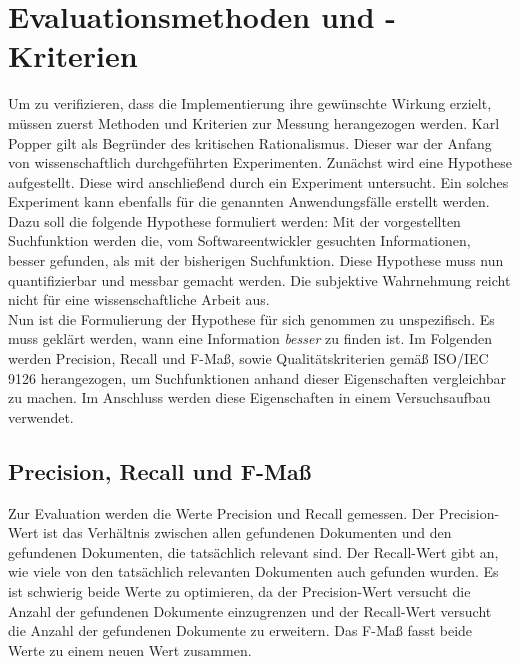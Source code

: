 \chapter{Evaluationsmethoden und -Kriterien}
Um zu verifizieren, dass die Implementierung ihre gewünschte Wirkung erzielt, müssen zuerst Methoden und Kriterien zur Messung herangezogen werden.
Karl Popper gilt als Begründer des kritischen Rationalismus.
Dieser war der Anfang von wissenschaftlich durchgeführten Experimenten.
Zunächst wird eine Hypothese aufgestellt.
Diese wird anschließend durch ein Experiment untersucht.
Ein solches Experiment kann ebenfalls für die genannten Anwendungsfälle erstellt werden.
Dazu soll die folgende Hypothese formuliert werden: Mit der vorgestellten Suchfunktion werden die, vom Softwareentwickler gesuchten Informationen, besser gefunden, als mit der bisherigen Suchfunktion.
Diese Hypothese muss nun quantifizierbar und messbar gemacht werden.
Die subjektive Wahrnehmung reicht nicht für eine wissenschaftliche Arbeit aus.\\

Nun ist die Formulierung der Hypothese für sich genommen zu unspezifisch.
Es muss geklärt werden, wann eine Information \textit{besser} zu finden ist.
Im Folgenden werden Precision, Recall und F-Maß, sowie Qualitätskriterien gemäß ISO/IEC 9126 herangezogen, um Suchfunktionen anhand dieser Eigenschaften vergleichbar zu machen.
Im Anschluss werden diese Eigenschaften in einem Versuchsaufbau verwendet. 

\section{Precision, Recall und F-Maß}
Zur Evaluation werden die Werte Precision und Recall gemessen.
Der Precision-Wert ist das Verhältnis zwischen allen gefundenen Dokumenten und den gefundenen Dokumenten, die tatsächlich relevant sind.
Der Recall-Wert gibt an, wie viele von den tatsächlich relevanten Dokumenten auch gefunden wurden.
Es ist schwierig beide Werte zu optimieren, da der Precision-Wert versucht die Anzahl der gefundenen Dokumente einzugrenzen und der Recall-Wert versucht die Anzahl der gefundenen Dokumente zu erweitern.
Das F-Maß fasst beide Werte zu einem neuen Wert zusammen.

